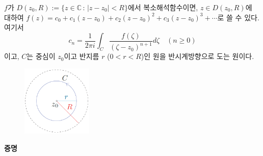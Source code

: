 \begin{salttheorem} {}{} \label{thm-4-4}
$f$가 $D(z_0,R) := \{ z\in \mathbb C \,:\, |z-z_0| <R \}$에서 복소해석함수이면,
$z\in D(z_0,R)$에 대하여
$f(z) = c_0 + c_1(z-z_0) + c_2(z-z_0)^2 + c_3(z-z_0)^3+ \cdots$로 쓸 수 있다.
여기서
\[
c_n = \dfrac1{2\pi i} \int_C \dfrac{f(\zeta)}{(\zeta-z_0)^{n+1}} d\zeta 
\quad (n\ge0)
\]
이고, $C$는 중심이 $z_0$이고 반지름 $r$ ($0<r<R$)인 원을 반시계방향으로 도는 원이다.
\end{salttheorem}

\begin{figure}[h!]
\begin{center}
\includegraphics[width=0.3\textwidth]{./SaltChapter/figs/fig-4-0-4}
\end{center}
\end{figure}

{\bf 증명}

